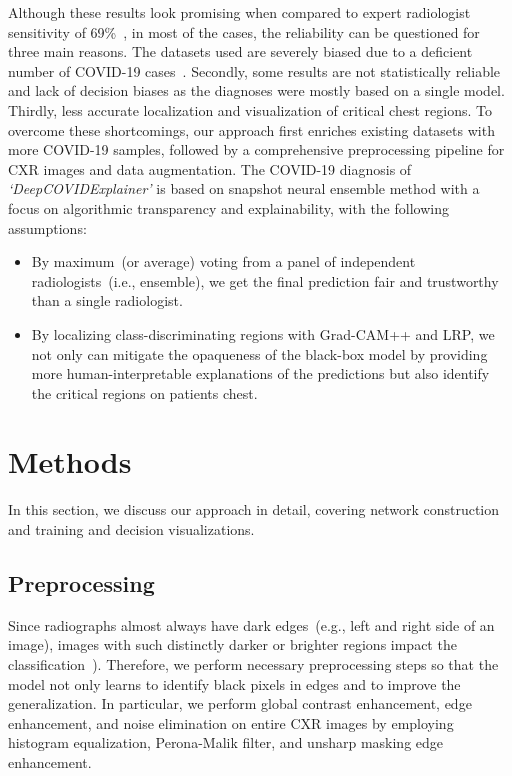 \documentclass[conference]{IEEEtran}
\begin{document}
Although these results look promising when compared to expert radiologist sensitivity of 69\%~\cite{tabik2020covidgr}, in most of the cases, the reliability can be questioned for three main reasons. The datasets used are severely biased due to a deficient number of COVID-19 cases~\cite{tabik2020covidgr}. Secondly, some results are not statistically reliable and lack of decision biases as the diagnoses were mostly based on a single model. Thirdly, less accurate localization and visualization of critical chest regions.
To overcome these shortcomings, our approach first enriches existing datasets with more COVID-19 samples, followed by a comprehensive preprocessing pipeline for CXR images and data augmentation. The COVID-19 diagnosis of \emph{`DeepCOVIDExplainer'} is based on snapshot neural ensemble method with a focus on algorithmic transparency and explainability, with the following assumptions:

\vspace{1mm}
\begin{itemize}
    \item By maximum~(or average) voting from a panel of independent radiologists~(i.e., ensemble), we get the final prediction fair and trustworthy than a single radiologist.
    \item By localizing class-discriminating regions with Grad-CAM++ and LRP, we not only can mitigate the opaqueness of the black-box model by providing more human-interpretable explanations of the predictions but also identify the critical regions on patients chest.
\end{itemize}
\vspace{1mm}

\section{Methods}
\label{sec:mm}
In this section, we discuss our approach in detail, covering network construction and training and decision visualizations. 

\subsection{Preprocessing}
Since radiographs almost always have dark edges~(e.g., left and right side of an image), images with such distinctly darker or brighter regions impact the  classification~\cite{86}). Therefore, we perform necessary preprocessing steps so that the model not only learns to identify black pixels in edges and to improve the generalization. In particular, we perform global contrast enhancement, edge enhancement, and noise elimination on entire CXR images by employing histogram equalization, Perona-Malik filter, and unsharp masking edge enhancement. %
\end{document}
